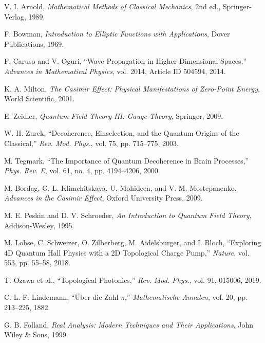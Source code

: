 \documentclass[12pt,a4paper]{article}
\begin{document}
\begin{thebibliography}{99}

V. I. Arnold, \emph{Mathematical Methods of Classical Mechanics}, 2nd ed., Springer-Verlag, 1989.

F. Bowman, \emph{Introduction to Elliptic Functions with Applications}, Dover Publications, 1969.

F. Caruso and V. Oguri, “Wave Propagation in Higher Dimensional Spaces,” \emph{Advances in Mathematical Physics}, vol. 2014, Article ID 504594, 2014.

K. A. Milton, \emph{The Casimir Effect: Physical Manifestations of Zero-Point Energy}, World Scientific, 2001.



E. Zeidler, \emph{Quantum Field Theory III: Gauge Theory}, Springer, 2009.

W. H. Zurek, “Decoherence, Einselection, and the Quantum Origins of the Classical,” \emph{Rev. Mod. Phys.}, vol. 75, pp. 715–775, 2003.

M. Tegmark, “The Importance of Quantum Decoherence in Brain Processes,” \emph{Phys. Rev. E}, vol. 61, no. 4, pp. 4194–4206, 2000.

M. Bordag, G. L. Klimchitskaya, U. Mohideen, and V. M. Mostepanenko, \emph{Advances in the Casimir Effect}, Oxford University Press, 2009.

M. E. Peskin and D. V. Schroeder, \emph{An Introduction to Quantum Field Theory}, Addison-Wesley, 1995.

M. Lohse, C. Schweizer, O. Zilberberg, M. Aidelsburger, and I. Bloch, “Exploring 4D Quantum Hall Physics with a 2D Topological Charge Pump,” \emph{Nature}, vol. 553, pp. 55–58, 2018.

T. Ozawa et al., “Topological Photonics,” \emph{Rev. Mod. Phys.}, vol. 91, 015006, 2019.

C. L. F. Lindemann, “Über die Zahl {$\pi$},” \emph{Mathematische Annalen}, vol. 20, pp. 213–225, 1882.

G. B. Folland, \emph{Real Analysis: Modern Techniques and Their Applications}, John Wiley \& Sons, 1999.




\end{thebibliography}
\end{document}
